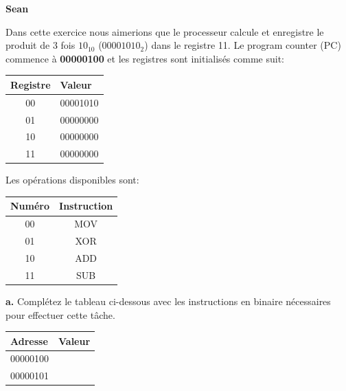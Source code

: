     \ShowSolutiontrue
    \ShowConseiltrue
    \ShowWarningtrue
    \titre

\begin{Exercice}[10 minutes]\textbf{Sean}

Dans cette exercice nous aimerions que le processeur calcule et enregistre le produit de 3 fois $10_{10}$ ($00001010_2$) dans le registre 11. Le program counter (PC) commence à \textbf{00000100} et les registres sont initialisés comme suit:

\begin{center}
\begin{tabular}{|c|l|}
\hline
\textbf{Registre} & \textbf{Valeur} \\
\hline
00 & 00001010 \\
01 & 00000000 \\
10 & 00000000 \\
11 & 00000000 \\
\hline
\end{tabular}
\end{center}

Les opérations disponibles sont:

\begin{center}
\begin{tabular}{|c|c|}
\hline
\textbf{Numéro} & \textbf{Instruction} \\
\hline
00 & MOV \\
01 & XOR \\
10 & ADD \\
11 & SUB \\
\hline
\end{tabular}
\end{center}

\bigskip %

\noindent %
\textbf{a.} Complétez le tableau ci-dessous avec les instructions en binaire nécessaires pour effectuer cette tâche.

\begin{center}
\begin{tabular}{|l|l|}
\hline
\textbf{Adresse} & \textbf{Valeur} \\
\hline
00000100 & \\
00000101 & \\
\hline
\end{tabular}
\end{center}


\end{Exercice}
